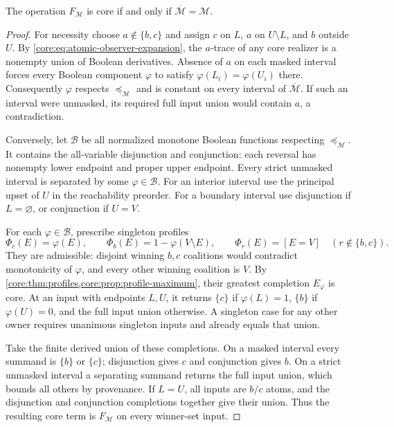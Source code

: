 \begin{theorem}\label{core:thm:interval-masks}
The operation $F_{\mathcal M}$ is core if and only if
$\overline{\mathcal M}=\mathcal M$.
\end{theorem}
\begin{proof}
For necessity choose $a\notin\{b,c\}$ and assign $c$ on $L$, $a$ on
$U\setminus L$, and $b$ outside $U$. By
\eqref{core:eq:atomic-observer-expansion}, the $a$-trace of any core
realizer is a nonempty union of Boolean derivatives. Absence of $a$ on
each masked interval forces every Boolean component $\varphi$ to satisfy
$\varphi(L_i)=\varphi(U_i)$ there. Consequently $\varphi$ respects
$\preceq_{\mathcal M}$ and is constant on every interval of
$\overline{\mathcal M}$. If such an interval were unmasked, its required
full input union would contain $a$, a contradiction.

Conversely, let $\mathcal B$ be all normalized monotone Boolean functions
respecting $\preceq_{\mathcal M}$. It contains the all-variable
disjunction and conjunction: each reversal has nonempty lower endpoint
and proper upper endpoint. Every strict unmasked interval is separated
by some $\varphi\in\mathcal B$. For an interior interval use the
principal upset of $U$ in the reachability preorder. For a boundary
interval use disjunction if $L=\varnothing$, or conjunction if $U=V$.

For each $\varphi\in\mathcal B$, prescribe singleton profiles
\[
 \Phi_c(E)=\varphi(E),\qquad
 \Phi_b(E)=1-\varphi(V\setminus E),\qquad
 \Phi_r(E)=[E=V]\quad(r\notin\{b,c\}).
\]
They are admissible: disjoint winning $b,c$ coalitions would contradict
monotonicity of $\varphi$, and every other winning coalition is $V$.
By \cref{core:thm:profiles,core:prop:profile-maximum}, their greatest
completion $E_\varphi$ is core. At an input with endpoints $L,U$, it
returns $\{c\}$ if $\varphi(L)=1$, $\{b\}$ if $\varphi(U)=0$, and
the full input union otherwise. A singleton case for any other owner
requires unanimous singleton inputs and already equals that union.

Take the finite derived union of these completions. On a masked interval
every summand is $\{b\}$ or $\{c\}$; disjunction gives $c$ and
conjunction gives $b$. On a strict unmasked interval a separating summand
returns the full input union, which bounds all others by provenance.
If $L=U$, all inputs are $b/c$ atoms, and the disjunction and conjunction
completions together give their union. Thus the resulting core term is
$F_{\mathcal M}$ on every winner-set input.
\end{proof}

